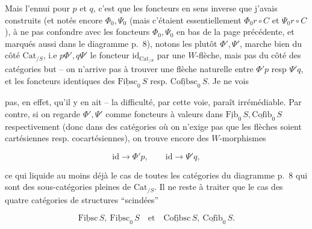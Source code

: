 Mais l'ennui pour $p$ et $q$, c'est que les foncteurs en sens inverse que j'avais construits (et notés encore $\Phi_0,\Psi_0$ (mais c'étaient essentiellement $\Phi_0 r\circ C$ et $\Psi_0 r\circ C$), à ne pas confondre avec les foncteurs $\Phi_0,\Psi_0$ en bas de la page précédente, et marqués aussi dans le diagramme p.~8), notons les plutôt $\Phi',\Psi'$, marche bien du côté $\mathrm{Cat}_{/S}$, i.e $p\Phi',q\Psi'$  le foncteur $\mathrm{id}_{\mathrm{Cat}_{/S}}$ par une $W$-flèche, mais pas du côté des catégories but -- on n'arrive pas à trouver une flèche naturelle entre $\Phi'p$ resp $\Psi'q$, et les foncteurs identiques des $\underline{\mathrm{Fibsc}}_0\,S$ resp. $\underline{\mathrm{Cofibsc}}_0\,S$. Je ne vois

pas, en effet, qu'il y en ait -- la difficulté, par cette voie, paraît irrémédiable. Par contre, si on regarde $\Phi',\Psi'$ comme foncteurs à valeurs dans $\underline{\mathrm{Fib}}_0\,S,\underline{\mathrm{Cofib}}_0\,S$ respectivement (donc dans des catégories où on n'exige pas que les flèches soient cartésiennes resp. cocartésiennes), on trouve encore des $W$-morphismes


\[
 \mathrm{id}\longrightarrow\Phi'p,\qquad \mathrm{id}\longrightarrow\Psi'q,
\]

ce qui liquide au moins déjà le cas de toutes les catégories du diagramme  p.~8 qui sont des sous-catégories pleines de $\mathrm{Cat}_{/S}$. Il ne reste  à traiter que le cas des quatre catégories de structures ``scindées''

\[
 \underline{\mathrm{Fibsc}}\,S,\ \underline{\mathrm{Fibsc}}_0\,S \quad\text{et}\quad \underline{\mathrm{Cofibsc}}\,S,\ \underline{\mathrm{Cofib}}_0\,S.
\]

